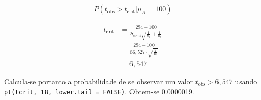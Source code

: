 \documentclass[
]{article}
\begin{document}
\hypertarget{section-7}{%
\subsection{}\label{section-7}}

\begin{align}
  P\left( t_{\text{obs}} > t_\text{crit} \big| \mu_A =  100 \right)
\end{align}

\begin{align}
  t_\text{crit} &= \frac{294-100}{S_{comb}\sqrt{\frac{1}{n_a}+ \frac{1}{n_b}}}\\
  &= \frac{294-100}{66,527 \cdot \sqrt{\frac{2}{10}}}\\
  &= 6,547
\end{align}

Calcula-se portanto a probabilidade de se observar um valor
\(t_{\text{obs}} > 6,547\) usando
\texttt{pt(tcrit,\ 18,\ lower.tail\ =\ FALSE)}. Obtem-se 0.0000019.
\end{document}
